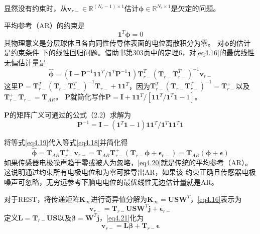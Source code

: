 显然没有约束时，从$\mathbf{v}_{r-}\in\mathbb{R}^{(N_c-1)\times1}$估计$\mathbf{\phi}\in\mathbb{R}^{N_c\times1}$是欠定的问题。

平均参考（AR）的约束是
\begin{equation}\label{eq4.17}
\mathbf{1}^T\mathbf{\phi}=0
\end{equation}
其物理意义是分层球体且各向同性传导体表面的电位离散积分为零。 对$\mathbf{\phi}$的估计是约束条件
下的线性回归问题。借助书\cite{magnus_matrix_2007}第303页中的定理6，对\eqref{eq4.16}的最优线性无偏估计量是
\begin{equation}\label{eq4.18}
\hat{\mathbf{\phi}}=(\mathbf{I}-\mathbf{P}^{-1}\mathbf{11}^T/{\mathbf{1}^T\mathbf{P}^{-1}\mathbf{1}})\mathbf{T}_{r-}^T(\mathbf{T}_{r-}\mathbf{T}_{r-}^T)^{-1}\mathbf{v}_{r-}
\end{equation}
这里$\mathbf{P}={\mathbf{T}_{r-}^T(\mathbf{T}_{r-}\mathbf{T}_{r-}^T)^{-1}\mathbf{T}_{r-}}+\mathbf{11}^T$，因为$\mathbf{T}_{r-}^T(\mathbf{T}_{r-}\mathbf{T}_{r-}^T)^{-1}=\mathbf{T}_{r-}^+$以及$\mathbf{T}_{r-}^+\mathbf{T}_{r-}=\mathbf{T}_{AR}$。 $\mathbf{P}$就简化写作$\mathbf{P}=\mathbf{I}+\mathbf{11}^T/{[\mathbf{11}^T/{\mathbf{1}^T\mathbf{1}-1}]}$。

$\mathbf{P}$的矩阵广义可通过\cite{baksalary_revisitation_2003}的公式（2.2）求解为
\begin{equation}\label{eq4.19}
\mathbf{P}^{-1}=\mathbf{I}-(\mathbf{1}^T\mathbf{1}-1)\mathbf{11}^T/{\mathbf{1}^T\mathbf{11}^T\mathbf{1}}
\end{equation}

将等式\eqref{eq4.19}代入等式\eqref{eq4.18}并简化得
\begin{equation}\label{eq4.20}
\hat{\mathbf{\phi}}=\mathbf{T}_{AR}\mathbf{T}_{r-}^+\mathbf{v}_{r-}=\mathbf{T}_{AR}\mathbf{T}_{r-}^+(\mathbf{T}_{r-}\mathbf{\phi}+\mathbf{\epsilon_{r-}})=\mathbf{T}_{AR}(\mathbf{\phi}+\mathbf{\epsilon})
\end{equation}
如果传感器电极噪声趋于零或被人为忽略，\eqref{eq4.20}就是传统的平均参考（AR）。 这说明通过约束所有电极电位和为零可推导出AR，如果该
约束正确且传感器电极噪声可忽略，无穷远参考下脑电电位的最优线性无边估计量就是AR。

对于REST，将传递矩阵$\mathbf{K}_{\infty}$进行奇异值分解为$\mathbf{K}_{\infty}=\mathbf{USW}^T$，\eqref{eq4.16}表示为
\begin{equation}\label{eq4.21}
\mathbf{v}_{r-}=\mathbf{T}_{r-}\mathbf{USW}^T\mathbf{j}+\mathbf{\epsilon}_{r-}
\end{equation}
定义$\mathbf{L}=\mathbf{T}_{r-}\mathbf{US}$以及$\mathbf{\beta}=\mathbf{W}^T\mathbf{j}$，\eqref{eq4.21}化为
\begin{equation}\label{eq4.22}
\mathbf{v}_{r-}=\mathbf{L\beta}+\mathbf{T}_{r-}\mathbf{\epsilon}
\end{equation}


